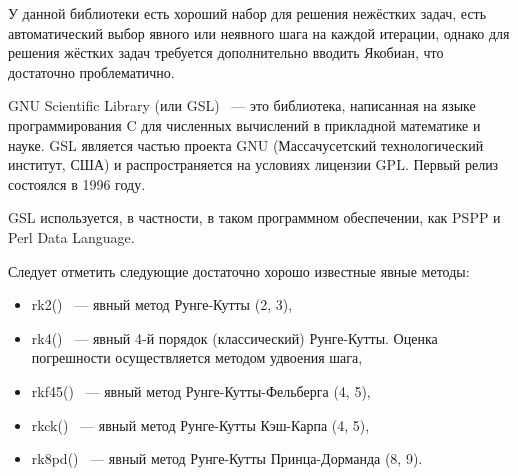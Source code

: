 У данной библиотеки есть хороший набор для решения нежёстких задач, есть автоматический выбор явного или неявного шага на каждой
итерации, однако для решения жёстких задач требуется дополнительно вводить Якобиан, что достаточно проблематично.

GNU Scientific Library (или GSL) ~--- это библиотека, написанная на языке программирования C для численных вычислений в прикладной
математике и науке. GSL является частью проекта GNU (Массачусетский технологический институт, США) и распространяется на условиях
лицензии GPL.
Первый релиз состоялся в 1996 году.

GSL используется, в частности, в таком программном обеспечении, как PSPP и Perl Data Language.

Следует отметить следующие достаточно хорошо известные явные методы:
\begin{itemize}
    \item rk2() ~--- явный метод Рунге-Кутты (2, 3),
    \item rk4() ~--- явный 4-й порядок (классический) Рунге-Кутты. Оценка погрешности осуществляется методом удвоения шага,
    \item rkf45() ~--- явный метод Рунге-Кутты-Фельберга (4, 5),
    \item rkck() ~--- явный метод Рунге-Кутты Кэш-Карпа (4, 5),
    \item rk8pd() ~--- явный метод Рунге-Кутты Принца-Дорманда (8, 9).
\end{itemize}

